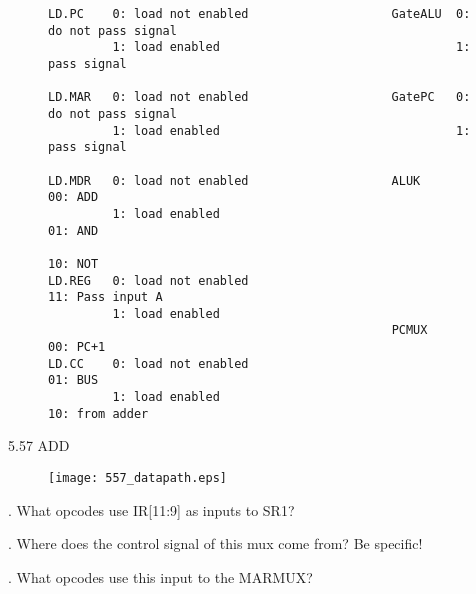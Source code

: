 \documentclass{patt}
\begin{document}
\begin{exercises}
\vspace{0.5in}

\begin{figure}[h!]
\begin{verbatim}                                                         
LD.PC    0: load not enabled                    GateALU  0: do not pass signal  
         1: load enabled                                 1: pass signal         
                                                                                
LD.MAR   0: load not enabled                    GatePC   0: do not pass signal  
         1: load enabled                                 1: pass signal         
                                                                                
LD.MDR   0: load not enabled                    ALUK     00: ADD                
         1: load enabled                                 01: AND                
                                                         10: NOT                
LD.REG   0: load not enabled                             11: Pass input A       
         1: load enabled                                                        
                                                PCMUX    00: PC+1               
LD.CC    0: load not enabled                             01: BUS                
         1: load enabled                                 10: from adder                               

\end{verbatim}
\end{figure}

\FloatBarrier

\item[5.57]ADD \begin{figure}[h]
\centering
\texttt{[image: 557\_datapath.eps]}
\end{figure}


. What opcodes use IR[11:9] as inputs to SR1?  

\vspace{.1in}

. Where does the control signal of this mux come from?  Be specific! 

\vspace{.1in}

. What opcodes use this input to the MARMUX? 

\vspace{.1in}


\end{exercises}
\end{document}
